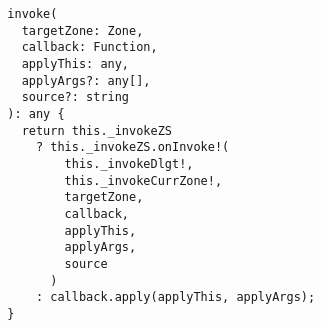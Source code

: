 \begin{verbatim}
  invoke(
    targetZone: Zone,
    callback: Function,
    applyThis: any,
    applyArgs?: any[],
    source?: string
  ): any {
    return this._invokeZS
      ? this._invokeZS.onInvoke!(
          this._invokeDlgt!,
          this._invokeCurrZone!,
          targetZone,
          callback,
          applyThis,
          applyArgs,
          source
        )
      : callback.apply(applyThis, applyArgs);
  }
\end{verbatim}
